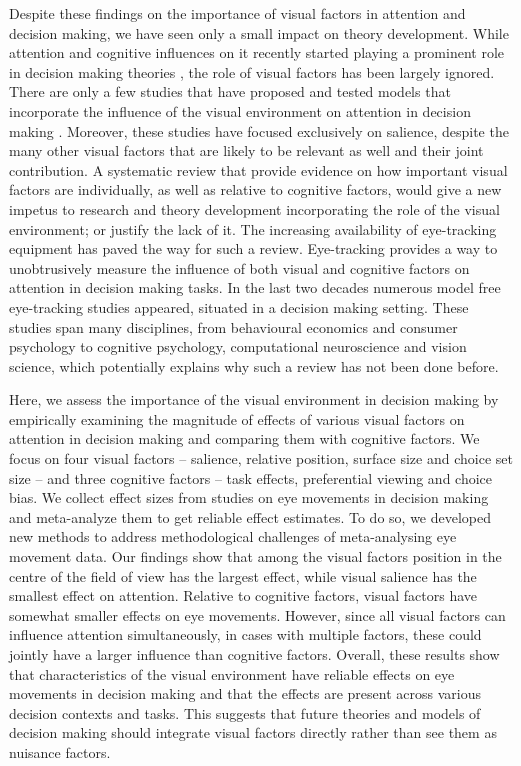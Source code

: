 \documentclass[english,natbib,man,floatsintext]{apa6}
\begin{document}
Despite these findings on the importance of visual factors in attention and decision making, we have seen only a small impact on theory development. While attention and cognitive influences on it recently started playing a prominent role in decision making theories \citep{callaway2019a, gluth2018, gluth2020, krajbich2010a, noguchi2018, thomas2019, usher2019}, the role of visual factors has been largely ignored. There are only a few studies that have proposed and tested models that incorporate the influence of the visual environment on attention in decision making \citep{chen2013, navalpakkam2010, towal2013a}. Moreover, these studies have focused exclusively on salience, despite the many other visual factors that are likely to be relevant as well and their joint contribution. A systematic review that provide evidence on how important visual factors are individually, as well as relative to cognitive factors, would give a new impetus to research and theory development incorporating the role of the visual environment; or justify the lack of it. The increasing availability of eye-tracking equipment has paved the way for such a review. Eye-tracking provides a way to unobtrusively measure the influence of both visual and cognitive factors on attention in decision making tasks. In the last two decades numerous model free eye-tracking studies appeared, situated in a decision making setting. These studies span many disciplines, from behavioural economics and consumer psychology to cognitive psychology, computational neuroscience and vision science, which potentially explains why such a review has not been done before.



Here, we assess the importance of the visual environment in decision making by empirically examining the magnitude of effects of various visual factors on attention in decision making and comparing them with cognitive factors. We focus on four visual factors -- salience, relative position, surface size and choice set size -- and three cognitive factors -- task effects, preferential viewing and choice bias. We collect effect sizes from studies on eye movements in decision making and meta-analyze them to get reliable effect estimates. To do so, we developed new methods to address methodological challenges of meta-analysing eye movement data. Our findings show that among the visual factors position in the centre of the field of view has the largest effect, while visual salience has the smallest effect on attention. Relative to cognitive factors, visual factors have somewhat smaller effects on eye movements.  However, since all visual factors can influence attention simultaneously, in cases with multiple factors, these could jointly have a larger influence than cognitive factors. Overall, these results show that characteristics of the visual environment have reliable effects on eye movements in decision making and that the effects are present across various decision contexts and tasks. This suggests that future theories and models of decision making should integrate visual factors directly rather than see them as nuisance factors.
\end{document}
